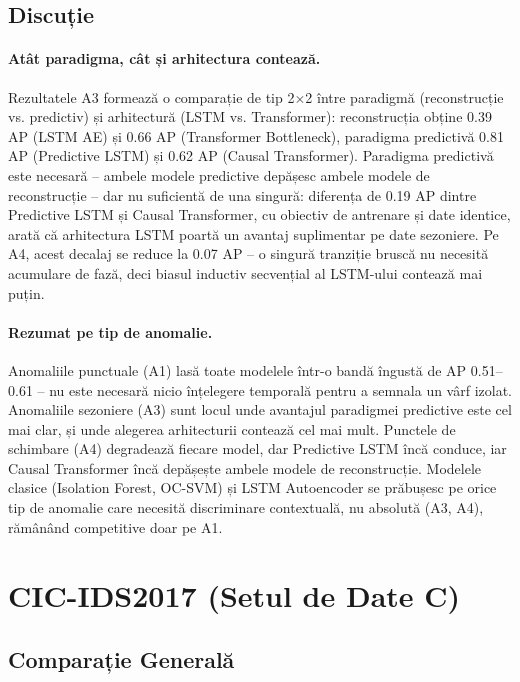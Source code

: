 \subsection{Discuție}

\paragraph{Atât paradigma, cât și arhitectura contează.} Rezultatele A3 formează o comparație de tip 2$\times$2 între paradigmă (reconstrucție vs. predictiv) și arhitectură (LSTM vs. Transformer): reconstrucția obține 0.39 AP (LSTM AE) și 0.66 AP (Transformer Bottleneck), paradigma predictivă 0.81 AP (Predictive LSTM) și 0.62 AP (Causal Transformer).
Paradigma predictivă este necesară -- ambele modele predictive depășesc ambele modele de reconstrucție -- dar nu suficientă de una singură: diferența de 0.19 AP dintre Predictive LSTM și Causal Transformer, cu obiectiv de antrenare și date identice, arată că arhitectura LSTM poartă un avantaj suplimentar pe date sezoniere. Pe A4, acest decalaj se reduce la 0.07 AP -- o singură tranziție bruscă nu necesită acumulare de fază, deci biasul inductiv secvențial al LSTM-ului contează mai puțin.

\paragraph{Rezumat pe tip de anomalie.} Anomaliile punctuale (A1) lasă toate modelele într-o bandă îngustă de AP 0.51--0.61 -- nu este necesară nicio înțelegere temporală pentru a semnala un vârf izolat.
Anomaliile sezoniere (A3) sunt locul unde avantajul paradigmei predictive este cel mai clar, și unde alegerea arhitecturii contează cel mai mult. Punctele de schimbare (A4) degradează fiecare model, dar Predictive LSTM încă conduce, iar Causal Transformer încă depășește ambele modele de reconstrucție. Modelele clasice (Isolation Forest, OC-SVM) și LSTM Autoencoder se prăbușesc pe orice tip de anomalie care necesită discriminare contextuală, nu absolută (A3, A4), rămânând competitive doar pe A1.



\section{CIC-IDS2017 (Setul de Date C)}

\subsection{Comparație Generală}

